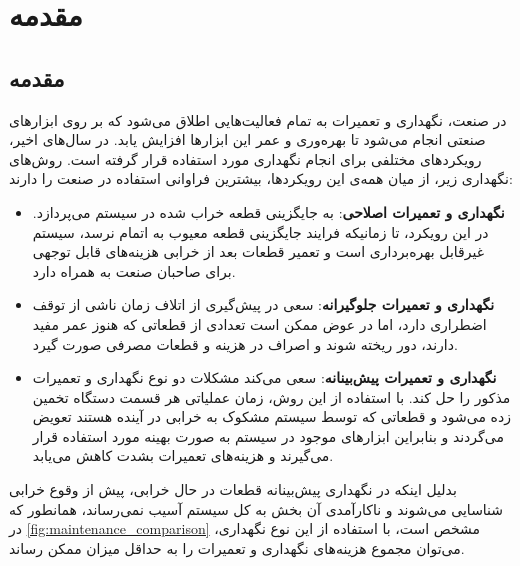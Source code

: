 \chapter{مقدمه}

\section{مقدمه}
در صنعت، نگهداری و تعمیرات به تمام فعالیت‌هایی اطلاق می‌شود که بر روی ابزارهای صنعتی انجام می‌شود تا بهره‌وری و عمر این ابزارها افزایش یابد. در سال‌های اخیر، رویکردهای مختلفی برای انجام نگهداری مورد استفاده قرار گرفته است. روش‌های نگهداری زیر، از میان همه‌ی این رویکردها، بیشترین فراوانی استفاده در صنعت را دارند\cite{zhao2022review}:

\begin{itemize}

\item \textbf{نگهداری و تعمیرات اصلاحی}: به جایگزینی قطعه خراب شده در سیستم می‌پردازد. در این رویکرد، تا زمانیکه فرایند جایگزینی قطعه معیوب به اتمام نرسد، سیستم غیرقابل بهره‌برداری است و تعمیر قطعات بعد از خرابی هزینه‌های قابل توجهی برای صاحبان صنعت به همراه دارد\cite{ran2019survey}.

\item \textbf{نگهداری و تعمیرات جلو‌گیرانه}: سعی در پیش‌گیری از اتلاف زمان ناشی از توقف اضطراری دارد، اما در عوض ممکن است تعدادی از قطعاتی که هنوز عمر مفید دارند، دور ریخته شوند و اصراف در هزینه و قطعات مصرفی صورت گیرد\cite{ran2019survey}.

\item \textbf{نگهداری و تعمیرات پیش‌بینانه}: سعی می‌کند مشکلات دو نوع نگهداری و تعمیرات مذکور را حل کند. با استفاده از این روش، زمان عملیاتی هر قسمت دستگاه تخمین زده می‌شود و قطعاتی که توسط سیستم مشکوک به خرابی در آینده هستند تعویض می‌گردند و بنابراین ابزارهای موجود در سیستم به صورت بهینه مورد استفاده قرار می‌گیرند و هزینه‌های تعمیرات بشدت کاهش می‌یابد\cite{zonta2020predictive, ran2019survey}.

\end{itemize}

بدلیل اینکه در نگهداری پیش‌بینانه قطعات در حال خرابی، پیش از وقوع خرابی شناسایی می‌شوند و ناکارآمدی آن بخش به کل سیستم آسیب نمی‌رساند، همانطور که در \cref{fig:maintenance_comparison} مشخص است، با استفاده از این نوع نگهداری، می‌توان مجموع هزینه‌های نگهداری و تعمیرات را به حداقل میزان ممکن رساند\cite{zonta2020predictive}.

